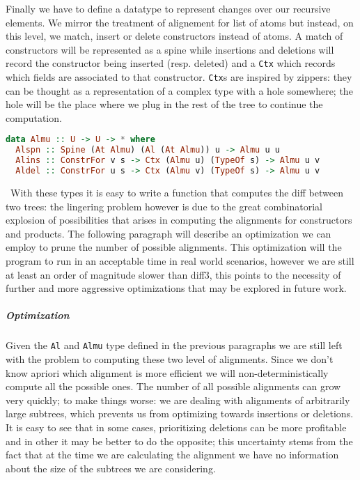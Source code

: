 \documentclass[11pt]{article}
\begin{document}
Finally we have to define a datatype to represent changes over our recursive 
elements. We mirror the treatment of alignement for list of atoms but instead, on this level, we 
match, insert or delete constructors instead of atoms. 
A match of constructors will be represented as a spine while insertions and 
deletions will record the constructor being inserted (resp. deleted) and a 
\texttt{Ctx} which records which fields are associated to that constructor.
\texttt{Ctx}s are inspired by zippers: they can be thought as a representation 
of a complex type with a hole somewhere; the hole will be the place where we 
plug in the rest of the tree to continue the computation.
\begin{lstlisting}[language=haskell]
data Almu :: U -> U -> * where
  Alspn :: Spine (At Almu) (Al (At Almu)) u -> Almu u u
  Alins :: ConstrFor v s -> Ctx (Almu u) (TypeOf s) -> Almu u v
  Aldel :: ConstrFor u s -> Ctx (Almu v) (TypeOf s) -> Almu u v
\end{lstlisting}
\
With these types it is easy to write a function that computes the diff between 
two trees: the lingering problem however is due to the great combinatorial 
explosion of possibilities that arises in computing the alignments for 
constructors and products. The following paragraph will describe an optimization 
we can employ to prune the number of possible alignments. This optimization 
will the program to run in an acceptable time in real world scenarios, however 
we are still at least an order of magnitude slower than diff3, this points to 
the necessity of further and more aggressive optimizations that may be explored 
in future work.

\subparagraph{Optimization}\label{optimizations}

Given the \texttt{Al} and \texttt{Almu} type defined in the previous paragraphs we are still left with the problem
to computing these two level of alignments. Since we don't know apriori which alignment
is more efficient we will non-deterministically compute all the possible ones. The number of all possible alignments  
can grow very quickly; to make things worse: we are dealing with alignments of arbitrarily large subtrees, which prevents
us from optimizing towards insertions or deletions. It is easy to see
that in some cases, prioritizing deletions can be more profitable and in
other it may be better to do the opposite; this uncertainty stems from
the fact that at the time we are calculating the alignment we have no
information about the size of the subtrees we are considering.
\end{document}
